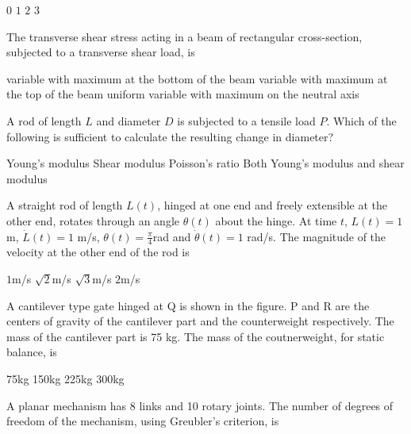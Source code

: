\documentclass[addpoints,10pt]{exam}
\begin{document}
\begin{questions}
    \begin{oneparchoices}
        \choice $0$
        \choice $1$
        \choice $2$
        \choice $3$
    \end{oneparchoices}

    \question The transverse shear stress acting in a beam of rectangular cross-section, subjected to a transverse shear load, is

    \begin{choices}
        \choice variable with maximum at the bottom of the beam
        \choice variable with maximum at the top of the beam
        \choice uniform
        \choice variable with maximum on the neutral axis
    \end{choices}

    \question A rod of length $L$ and diameter $D$ is subjected to a tensile load $P$. Which of the following is sufficient to calculate the resulting change in diameter?

    \begin{choices}
        \choice Young's modulus
        \choice Shear modulus
        \choice Poisson's ratio
        \choice Both Young's modulus and shear modulus
    \end{choices}

    \question A straight rod of length $L(t)$, hinged at one end and freely extensible at the other end, rotates through an angle $\theta(t)$ about the hinge. At time $t$, $L(t)=1$ m, $\dot{L}(t)=1$ m/s, $\theta(t)=\frac{\pi}{4}$rad and $\dot{\theta}(t)=1$ rad/s. The magnitude of the velocity at the other end of the rod is

    \begin{oneparchoices}
        \choice $1$m/s
        \choice $\sqrt{2}$m/s
        \choice $\sqrt{3}$m/s
        \choice $2$m/s
    \end{oneparchoices}

    \question A cantilever type gate hinged at Q is shown in the figure. P and R are the centers of gravity of the cantilever part and the counterweight respectively. The mass of the cantilever part is 75 kg. The mass of the coutnerweight, for static balance, is %

    \begin{oneparchoices}
        \choice 75kg
        \choice 150kg
        \choice 225kg
        \choice 300kg
    \end{oneparchoices}

    \question A planar mechanism has 8 links and 10 rotary joints. The number of degrees of freedom of the mechanism, using Greubler's criterion, is


\end{questions}
\end{document}

